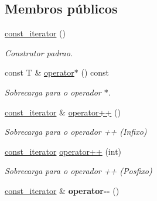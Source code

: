 \subsection*{Membros públicos}
\begin{DoxyCompactItemize}
\item 
\hyperlink{class_list_1_1const__iterator_a504c0d1347b6fc165a41176065852e35}{const\+\_\+iterator} ()\hypertarget{class_list_1_1const__iterator_a504c0d1347b6fc165a41176065852e35}{}\label{class_list_1_1const__iterator_a504c0d1347b6fc165a41176065852e35}

\begin{DoxyCompactList}\small\item\em Construtor padrao. \end{DoxyCompactList}\item 
const T \& \hyperlink{class_list_1_1const__iterator_a6d061aa3f906a651f9c3c5a18e17c4e1}{operator$\ast$} () const \hypertarget{class_list_1_1const__iterator_a6d061aa3f906a651f9c3c5a18e17c4e1}{}\label{class_list_1_1const__iterator_a6d061aa3f906a651f9c3c5a18e17c4e1}

\begin{DoxyCompactList}\small\item\em Sobrecarga para o operador $\ast$. \end{DoxyCompactList}\item 
\hyperlink{class_list_1_1const__iterator}{const\+\_\+iterator} \& \hyperlink{class_list_1_1const__iterator_a56734329e70fcd03620d3259fee42cce}{operator++} ()\hypertarget{class_list_1_1const__iterator_a56734329e70fcd03620d3259fee42cce}{}\label{class_list_1_1const__iterator_a56734329e70fcd03620d3259fee42cce}

\begin{DoxyCompactList}\small\item\em Sobrecarga para o operador ++ (Infixo) \end{DoxyCompactList}\item 
\hyperlink{class_list_1_1const__iterator}{const\+\_\+iterator} \hyperlink{class_list_1_1const__iterator_ad33d9fb3bcbc5e460459317f04c28a78}{operator++} (int)\hypertarget{class_list_1_1const__iterator_ad33d9fb3bcbc5e460459317f04c28a78}{}\label{class_list_1_1const__iterator_ad33d9fb3bcbc5e460459317f04c28a78}

\begin{DoxyCompactList}\small\item\em Sobrecarga para o operador ++ (Posfixo) \end{DoxyCompactList}\item 
\hyperlink{class_list_1_1const__iterator}{const\+\_\+iterator} \& {\bfseries operator-\/-\/} ()\hypertarget{class_list_1_1const__iterator_aeccf9baf7498dafa7223225ee7aeaaf1}{}\label{class_list_1_1const__iterator_aeccf9baf7498dafa7223225ee7aeaaf1}


\end{DoxyCompactItemize}
